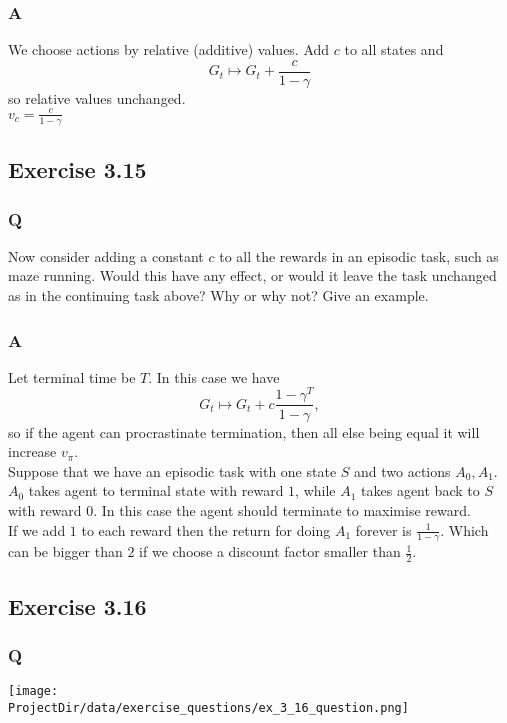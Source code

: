\subsubsection{A}
We choose actions by relative (additive) values. Add $c$ to all states and 
\begin{equation}
    G_t \mapsto G_t + \frac{c}{1 - \gamma}
\end{equation}
so relative values unchanged.\\

$v_c = \frac{c}{1 - \gamma}$

\subsection{Exercise 3.15}
\subsubsection{Q}
Now consider adding a constant $c$ to all the rewards in an episodic task, such as maze running. Would this have any effect, or would it leave the task unchanged as in the continuing task above? Why or why not? Give an example.

\subsubsection{A}
Let terminal time be $T$. In this case we have 
\begin{equation}
    G_t \mapsto G_t + c\frac{1 - \gamma^T}{1 - \gamma},
\end{equation}
so if the agent can procrastinate termination, then all else being equal it will increase $v_\pi$.\\

Suppose that we have an episodic task with one state $S$ and two actions $A_0, A_1$. $A_0$ takes agent to terminal state with reward $1$, while $A_1$ takes agent back to $S$ with reward $0$. In this case the agent should terminate to maximise reward. \\ 

If we add $1$ to each reward then the return for doing $A_1$ forever is $\frac{1}{1-\gamma}$. Which can be bigger than $2$ if we choose a discount factor smaller than $\frac12$.

\subsection{Exercise 3.16}
\subsubsection{Q}
\texttt{[image: \\ProjectDir/data/exercise\_questions/ex\_3\_16\_question.png]}
 
